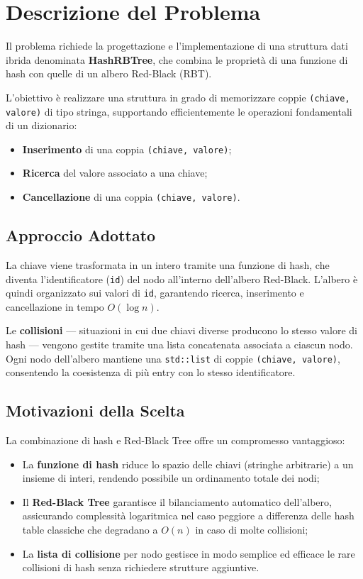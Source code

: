 \chapter{Descrizione del Problema}

Il problema richiede la progettazione e l'implementazione di una struttura dati ibrida 
denominata \textbf{HashRBTree}, che combina le proprietà di una funzione di hash con 
quelle di un albero Red-Black (RBT).

L'obiettivo è realizzare una struttura in grado di memorizzare coppie 
\texttt{(chiave, valore)} di tipo stringa, supportando efficientemente le operazioni 
fondamentali di un dizionario:

\begin{itemize}
    \item \textbf{Inserimento} di una coppia \texttt{(chiave, valore)};
    \item \textbf{Ricerca} del valore associato a una chiave;
    \item \textbf{Cancellazione} di una coppia \texttt{(chiave, valore)}.
\end{itemize}

\section{Approccio Adottato}

La chiave viene trasformata in un intero tramite una funzione di hash, che diventa 
l'identificatore (\texttt{id}) del nodo all'interno dell'albero Red-Black. 
L'albero è quindi organizzato sui valori di \texttt{id}, garantendo ricerca, 
inserimento e cancellazione in tempo $O(\log n)$.

Le \textbf{collisioni} --- situazioni in cui due chiavi diverse producono lo stesso 
valore di hash --- vengono gestite tramite una lista concatenata associata a ciascun 
nodo. Ogni nodo dell'albero mantiene una \texttt{std::list} di coppie 
\texttt{(chiave, valore)}, consentendo la coesistenza di più entry con lo stesso 
identificatore.

\section{Motivazioni della Scelta}

La combinazione di hash e Red-Black Tree offre un compromesso vantaggioso:

\begin{itemize}
    \item La \textbf{funzione di hash} riduce lo spazio delle chiavi (stringhe 
    arbitrarie) a un insieme di interi, rendendo possibile un ordinamento totale 
    dei nodi;
    \item Il \textbf{Red-Black Tree} garantisce il bilanciamento automatico 
    dell'albero, assicurando complessità logaritmica nel caso peggiore a differenza 
    delle hash table classiche che degradano a $O(n)$ in caso di molte collisioni;
    \item La \textbf{lista di collisione} per nodo gestisce in modo semplice ed 
    efficace le rare collisioni di hash senza richiedere strutture aggiuntive.
\end{itemize}